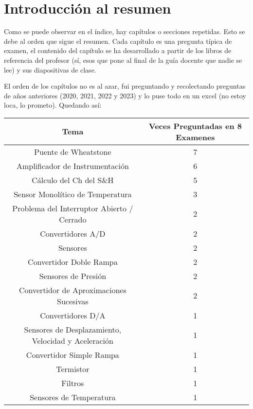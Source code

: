 \chapter{Introducción al resumen}
Como se puede observar en el índice, hay capítulos o secciones repetidas. Esto se debe al orden que sigue el resumen. Cada capítulo es una pregunta típica de examen, el contenido del capítulo se ha desarrollado a partir de los libros de referencia del profesor (sí, esos que pone al final de la guía docente que nadie se lee) y sus diapositivas de clase. 

El orden de los capítulos no es al azar, fui preguntando y recolectando preguntas de años anteriores (2020, 2021, 2022 y 2023) y lo puse todo en un excel (no estoy loca, lo prometo). Quedando así:

\begin{table}[H]
    \centering
    \begin{tabular}{|c|c|}
        \hline
        Tema & Veces Preguntadas en 8 Examenes \\
        \hline
        Puente de Wheatstone & 7 \\
        Amplificador de Instrumentación & 6 \\
        Cálculo del Ch del S\&H & 5 \\
        Sensor Monolítico de Temperatura & 3 \\
        Problema del Interruptor Abierto / Cerrado & 2 \\
        Convertidores A/D & 2 \\
        Sensores & 2 \\
        Convertidor Doble Rampa & 2 \\
        Sensores de Presión & 2 \\
        Convertidor de Aproximaciones Sucesivas & 2 \\
        Convertidores D/A & 1 \\
        Sensores de Desplazamiento, Velocidad y Aceleración & 1 \\
        Convertidor Simple Rampa & 1 \\
        Termistor & 1 \\
        Filtros & 1 \\
        Sensores de Temperatura & 1 \\
        \hline
    \end{tabular}
\end{table}